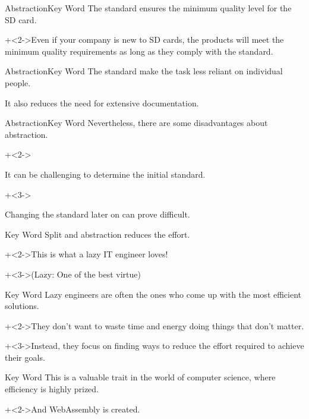 \begin{frame}{Abstraction}{Key Word}
    The standard ensures the minimum quality level for the SD card.
    \vspace{4ex}

    \onslide+<2->{Even if your company is new to SD cards, the products will meet the minimum quality requirements as long as they comply with the standard.}
\end{frame}


\begin{frame}{Abstraction}{Key Word}
    The standard make the task less reliant on individual people.
    \vspace{4ex}

    It also reduces the need for extensive documentation.
\end{frame}


\begin{frame}{Abstraction}{Key Word}
    Nevertheless, there are some disadvantages about abstraction.
    \vspace{4ex}

    \begin{itemize}
        \onslide+<2->{\item It can be challenging to determine the initial standard.}
        \onslide+<3->{\item Changing the standard later on can prove difficult.}
    \end{itemize}
\end{frame}


\begin{frame}{Key Word}
    Split and abstraction reduces the effort.
    \vspace{4ex}

    \onslide+<2->{This is what a lazy IT engineer loves!}
    \vspace{2ex}

    \onslide+<3->{{\Large (Lazy: One of the best virtue)}}
\end{frame}


\begin{frame}{Key Word}{}
    Lazy engineers are often the ones who come up with the most efficient solutions.
    \vspace{4ex}

    \onslide+<2->{They don't want to waste time and energy doing things that don't matter.}
    \vspace{4ex}

    \onslide+<3->{Instead, they focus on finding ways to reduce the effort required to achieve their goals.}
\end{frame}


\begin{frame}{Key Word}{}
    This is a valuable trait in the world of computer science, where efficiency is highly prized.
    \vspace{4ex}

    \onslide+<2->{And WebAssembly is created.}
\end{frame}
